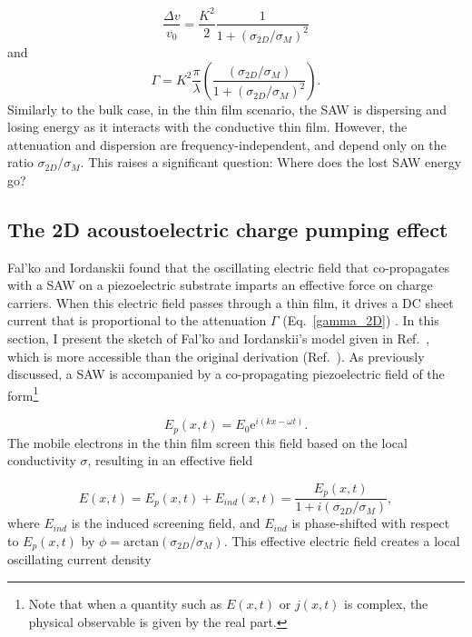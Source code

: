 \documentclass{beavtex_dub_edit}
\begin{document}
\begin{equation}
    \frac{\Delta v}{v_0} = \frac{K^2}{2}\frac{1}{1+(\sigma_{2D}/\sigma_M)^2} \label{v_2D}
\end{equation}
and
\begin{equation}
    \Gamma = K^2 \frac{\pi}{\lambda}\left(\frac{(\sigma_{2D}/\sigma_M)}{1+(\sigma_{2D}/\sigma_M)^2}\right). \label{gamma_2D}
\end{equation}
Similarly to the bulk case, in the thin film scenario, the SAW is dispersing and losing energy as it interacts with the conductive thin film. However, the attenuation and dispersion are frequency-independent, and depend only on the ratio $\sigma_{2D}/\sigma_M$. This raises a significant question: Where does the lost SAW energy go? 

\subsection{The 2D acoustoelectric charge pumping effect} \label{classical relaxtion model}

Fal'ko and Iordanskii found that the oscillating electric field that co-propagates with a SAW on a piezoelectric substrate imparts an effective force on charge carriers. When this electric field passes through a thin film, it drives a DC sheet current that is proportional to the attenuation $\Gamma$ (Eq.\ \ref{gamma_2D}) \cite{falko_acoustoelectric_1993}. In this section, I present the sketch of Fal'ko and Iordanskii's model given in Ref.\ \cite{esslinger_ultrasonic_1994}, which is more accessible than the original derivation (Ref.\ \cite{falko_acoustoelectric_1993}). As previously discussed, a SAW is accompanied by a co-propagating piezoelectric field of the form\footnote{Note that when a quantity such as $E(x,t)$ or $j(x,t)$ is complex, the physical observable is given by the real part.}

\begin{equation}
    E_p(x, t) = E_0 \mathrm{e}^{i(kx - \omega t)}. \label{SAW plane wave}
\end{equation}
The mobile electrons in the thin film screen this field based on the local conductivity $\sigma$, resulting in an effective field

\begin{equation}
    E(x,t) = E_p(x,t) + E_{ind}(x,t) = \frac{E_p(x,t)}{1+i(\sigma_{2D}/\sigma_M)}, \label{E eff}
\end{equation}
where $E_{ind}$ is the induced screening field, and $E_{ind}$ is phase-shifted with respect to $E_p(x,t)$ by $\phi = \mathrm{arctan}(\sigma_{2D}/\sigma_M)$.
This effective electric field creates a local oscillating current density
\end{document}
